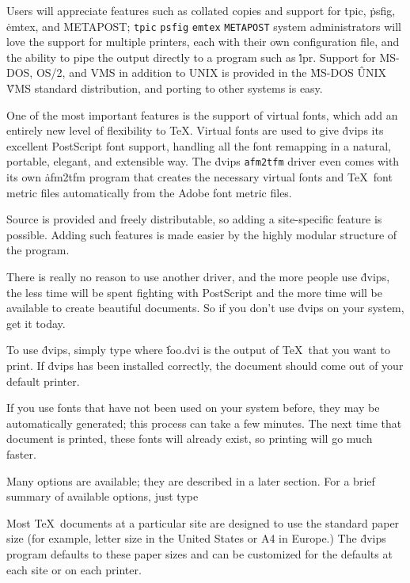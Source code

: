 Users will appreciate features such as collated copies and support
for \.{tpic}, \.{psfig}, \.{emtex}, and \.{METAPOST};
\^{{\tt tpic}}
\^{{\tt psfig}}
\^{{\tt emtex}}
\^{{\tt METAPOST}}
system administrators will love the support for multiple printers, each
with their own configuration file, and the ability to pipe the output
directly to a program such as \.{lpr}.
Support for MS-DOS, OS/2, and VMS in addition to UNIX is provided in the
\^{MS-DOS}
\^{UNIX}
\^{VMS}
standard distribution, and porting to other systems is easy.

One of the most important features is the support of virtual fonts, which
add an entirely new level of flexibility to \TeX.  Virtual fonts are used to
give \.{dvips} its excellent PostScript font support, handling all the font
remapping in a natural, portable, elegant, and extensible way.  The \.{dvips}
\^{{\tt afm2tfm}}
driver even comes with its own \.{afm2tfm} program that creates the necessary
virtual fonts and \TeX\ font metric files automatically from the Adobe
font metric files.

Source is provided and freely distributable, so adding a site-specific feature
is possible.  Adding such features is made easier by the highly modular
structure of the program.

There is really no reason to use another driver, and the more people use
\.{dvips}, the less time will be spent fighting with PostScript and the
more time will be available to create beautiful documents.
So if you don't use \.{dvips} on your system, get it today.


To use \.{dvips}, simply type
\noindent
where \.{foo.dvi} is the output of \TeX\ that you want to print.  If \.{dvips}
has been installed correctly, the document should come out of your default
printer.

If you use fonts that have not been used on your system before, they
may be automatically generated; this process can take a few minutes.
The next time that document is printed, these fonts will already exist, so
printing will go much faster.

Many options are available; they are described in a later section.
For a brief summary of available options, just type


Most \TeX\ documents at a particular site are designed to use the
standard paper size (for example, letter size in the United States
or A4 in Europe.)  The \.{dvips} program defaults to these paper
sizes and can be customized for the defaults at each site or on
each printer.


